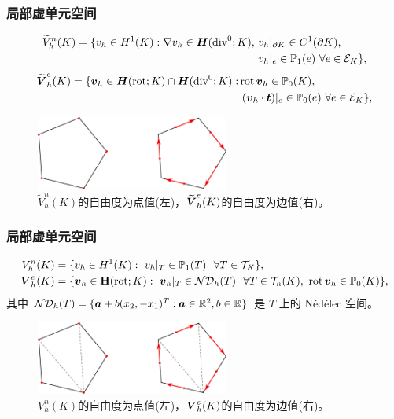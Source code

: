 \documentclass[notheorems,serif]{beamer}
\begin{document}
\begin{frame}
\frametitle{局部虚单元空间}
\small
\begin{definition}[局部虚单元空间]
$$
\begin{aligned}
\widetilde{V}^n_h(K) = \{ v_h \in H^1(K):  \nabla v_h\in \boldsymbol{H}(\operatorname{div}^0; K),
& ~ v_h|_{\partial K} \in C^1(\partial K), \\
&~ v_h|_e \in \mathbb{P}_1(e) ~ \forall e\in \mathcal{E}_K \}, \label{ive_space1} \\
\end{aligned}
$$
$$
\begin{aligned}
\widetilde{\boldsymbol{V}}^e_h(K) = \{ \boldsymbol{v}_h \in \boldsymbol{H}(\operatorname{rot};K) \cap \boldsymbol{H}(\operatorname{div}^0;K):
& \operatorname{rot} \boldsymbol{v}_h \in \mathbb{P}_0(K), \\
& ~ (\boldsymbol{v}_h\cdot\boldsymbol{t})|_e \in \mathbb{P}_0(e) ~ \forall e\in \mathcal{E}_K \}, \label{ive_space2}
\end{aligned}
$$
\end{definition}
\begin{figure}[htp]
\centering
\includegraphics[width=2.5in]{../figures/maxwell/h1_hrot.pdf}
\caption{$\widetilde{V}^n_h(K)$的自由度为点值(左)，$\widetilde{\boldsymbol{V}}^e_h(K)$的自由度为边值(右)。}
\end{figure}
\end{frame}

\begin{frame}
\frametitle{局部虚单元空间}
\small
\begin{definition}[局部虚单元空间]
$$
\begin{aligned}
V^n_h(K) & = \{ v_h \in H^1(K) : ~ v_h|_T\in\mathbb{P}_1(T) ~~ \forall T \in \mathcal{T}_K \},  \label{auxi_v_space_1_polygon1} \\
\boldsymbol{V}^e_h(K) & = \{ \boldsymbol{v}_h \in \mathbf{H}(\operatorname{rot} ;K): ~  \boldsymbol{v}_h|_{T} \in \mathcal{ND}_h(T) ~~ \forall T\in \mathcal T_h(K),
~  \operatorname{rot} \boldsymbol{v}_h \in \mathbb{P}_0(K)\}, \label{auxi_v_space_1_polygon2}
\end{aligned}
$$
其中 $\mathcal{ND}_h(T) = \{\boldsymbol{a} + b(x_2, -x_1)^T : \boldsymbol{a}\in\mathbb{R}^2,
b\in \mathbb{R}\}$ 是 $T$ 上的 N\'ed\'elec 空间。
\end{definition}
\begin{figure}[htp]
\centering
\includegraphics[width=2.5in]{../figures/maxwell/h1_hrot_new.pdf}
\caption{$V^n_h(K)$的自由度为点值(左)，$\boldsymbol{V}^e_h(K)$的自由度为边值(右)。}
\end{figure}
\end{frame}
\end{document}
